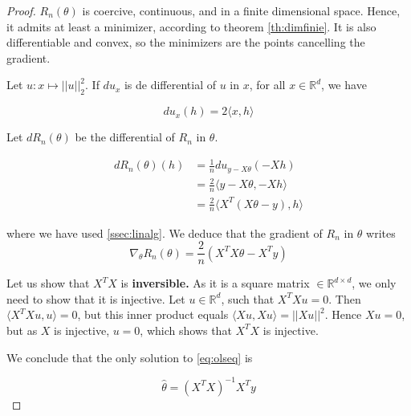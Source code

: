 \documentclass[
10pt, %
a4paper, %
oneside, %
headinclude,footinclude, %
BCOR5mm, %
]{scrartcl}
\begin{document}
\begin{proof}

    $R_n(\theta)$ is coercive, continuous, and in a finite dimensional space. Hence, it admits at least a minimizer, according to theorem \ref{th:dimfinie}.  It is also differentiable and convex, so the minimizers are the points cancelling the gradient.

    Let $u:x\mapsto ||u||_2^2$. If $du_x$ is de differential of $u$ in $x$, for all $x\in \mathbb{R}^d$, we have

    \begin{equation*}
	du_x(h) = 2\langle x,h\rangle
    \end{equation*}

    Let $dR_n(\theta)$ be the differential of $R_n$ in $\theta$.

    \begin{equation*}
	\begin{aligned}
	    dR_n(\theta)(h) &= \frac{1}{n} du_{y-X\theta}(-Xh)\\
	    &= \frac{2}{n} \langle y-X\theta, -Xh \rangle\\
	    &= \frac{2}{n} \langle X^T(X\theta-y), h \rangle
	\end{aligned}
    \end{equation*}

    where we have used \ref{ssec:linalg}. We deduce that the gradient of $R_n$ in $\theta$ writes
    \begin{equation}
	\label{eq:olseq}
        \nabla_{\theta} R_n(\theta) = \frac{2}{n} (X^TX\theta-X^Ty)
    \end{equation}

    Let us show that $X^TX$ is \textbf{{inversible.}} As it is a square matrix $\in \mathbb{R}^{d\times d}$, we only need to show that it is injective. Let $u\in \mathbb{R}^d$, such that $X^TXu = 0$. Then $ \langle X^TXu, u \rangle=0$, but this inner product equals $\langle Xu, Xu \rangle = ||Xu||^2$. Hence $Xu=0$, but as $X$ is injective, $u=0$, which shows that $X^TX$ is injective.

    We conclude that the only solution to \ref{eq:olseq} is 

    \begin{equation*}
	\hat{\theta} = (X^TX)^{-1}X^Ty
    \end{equation*}



\end{proof}
\end{document}

